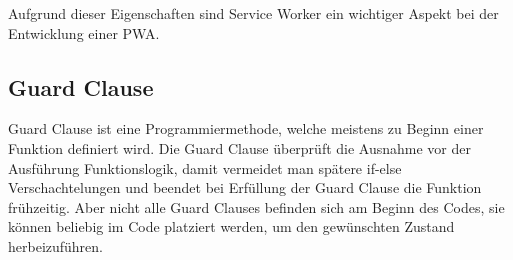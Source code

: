 \noindent
Aufgrund dieser Eigenschaften sind Service Worker ein wichtiger Aspekt bei der Entwicklung einer PWA. \cite{rytewiki_serviceworker}

\subsection[Guard Clause]{Guard Clause\authorlinda}
Guard Clause ist eine Programmiermethode, welche meistens zu Beginn einer Funktion definiert wird. Die Guard Clause überprüft die Ausnahme vor der Ausführung Funktionslogik, damit vermeidet man spätere if-else Verschachtelungen und beendet bei Erfüllung der Guard Clause die Funktion frühzeitig. Aber nicht alle Guard Clauses befinden sich am Beginn des Codes, sie können beliebig im Code platziert werden, 
um den gewünschten Zustand herbeizuführen. \cite{heise_guard_clauses}

\newpage